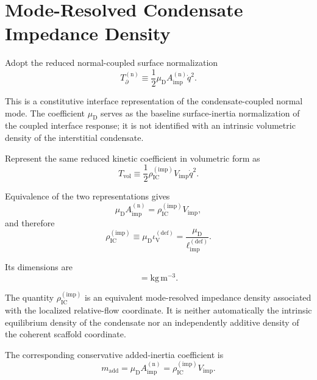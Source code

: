 \section{Mode-Resolved Condensate Impedance Density}
\label{sec:AP_mode_resolved_density}

Adopt the reduced normal-coupled surface normalization
\begin{equation}
    T_{\partial}^{(\mathrm{n})}
    \equiv
    \frac{1}{2}
    \mu_{\mathrm{D}}
    A_{\mathrm{imp}}^{(\mathrm{n})}
    \dot{q}^2.
\end{equation}

This is a constitutive interface representation of the condensate-coupled normal mode. The coefficient $\mu_{\mathrm{D}}$ serves as the baseline surface-inertia normalization of the coupled interface response; it is not identified with an intrinsic volumetric density of the interstitial condensate.

Represent the same reduced kinetic coefficient in volumetric form as
\begin{equation}
    T_{\mathrm{vol}}
    \equiv
    \frac{1}{2}
    \rho_{\mathrm{IC}}^{(\mathrm{imp})}
    V_{\mathrm{imp}}
    \dot{q}^2.
\end{equation}

Equivalence of the two representations gives
\begin{equation}
    \mu_{\mathrm{D}}
    A_{\mathrm{imp}}^{(\mathrm{n})}
    =
    \rho_{\mathrm{IC}}^{(\mathrm{imp})}
    V_{\mathrm{imp}},
\end{equation}
and therefore
\begin{equation}
    \rho_{\mathrm{IC}}^{(\mathrm{imp})}
    \equiv
    \mu_{\mathrm{D}}
    \iota_{\mathrm{V}}^{(\mathrm{def})}
    =
    \frac{
        \mu_{\mathrm{D}}
    }{
        \ell_{\mathrm{imp}}^{(\mathrm{def})}
    }.
\end{equation}

Its dimensions are
\begin{equation}
    [\rho_{\mathrm{IC}}^{(\mathrm{imp})}]
    =
    \mathrm{kg\,m^{-3}}.
\end{equation}

The quantity $\rho_{\mathrm{IC}}^{(\mathrm{imp})}$ is an equivalent mode-resolved impedance density associated with the localized relative-flow coordinate. It is neither automatically the intrinsic equilibrium density of the condensate nor an independently additive density of the coherent scaffold coordinate.

The corresponding conservative added-inertia coefficient is
\begin{equation}
    m_{\mathrm{add}}
    =
    \mu_{\mathrm{D}}
    A_{\mathrm{imp}}^{(\mathrm{n})}
    =
    \rho_{\mathrm{IC}}^{(\mathrm{imp})}
    V_{\mathrm{imp}}.
\end{equation}

